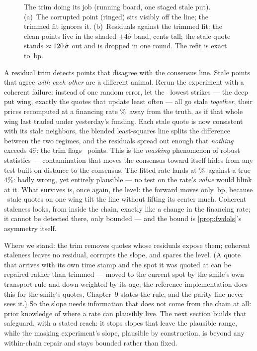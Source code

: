 \begin{figure}[htbp]
\centering
{}
\caption{The trim doing its job (running board, one staged stale
put).  (a)~The corrupted point (ringed) sits visibly off the line;
the trimmed fit ignores it.  (b)~Residuals against the trimmed fit:
the clean points live in the shaded $\pm4\hat\sigma$ band, cents
tall; the stale quote stands $\approx120\,\hat\sigma$
out and is dropped in one round.  The refit is exact to
\MacFwdTrimErrBp\,bp.}
\label{fig:fwdtrim}
\end{figure}

\begin{remark}
\label{rem:fwdmask}
A residual trim detects points that disagree with the consensus line.
Stale points that agree \emph{with each other} are a different
animal.  Rerun the experiment with a coherent failure: instead of one
random error, let the \MacFwdMaskNWing\ lowest strikes --- the deep
put wing, exactly the quotes that update least often --- all go stale
\emph{together}, their prices recomputed at a financing rate
\MacFwdMaskDeltaRatePct\%\ away from the truth, as if that whole wing
last traded under yesterday's funding.  Each stale quote is now consistent with its stale
neighbors, the blended least-squares line splits the difference
between the two regimes, and the residuals spread out enough that
\emph{nothing} exceeds $4\hat\sigma$: the trim flags
\MacFwdMaskNOut\ points.  This is the \emph{masking} phenomenon of
robust statistics \citep{RousseeuwLeroy1987} --- contamination that
moves the consensus toward itself hides from any test built on
distance to the consensus.  The fitted rate lands at
\MacFwdMaskRatePct\%\ against a true $4\%$: badly wrong, yet entirely
plausible --- no test on the rate's \emph{value} would blink at it.  What survives is, once again, the level:
the forward moves only \MacFwdMaskFwdErrBp\,bp, because
\MacFwdMaskNWing\ stale quotes on one wing tilt the line without
lifting its center much.  Coherent staleness looks, from inside the
chain, exactly like a change in the financing rate; it cannot be
detected there, only bounded --- and the bound is
\cref{prop:fwdols}'s asymmetry itself.
\end{remark}

Where we stand: the trim removes quotes whose residuals expose them;
coherent staleness leaves no residual, corrupts the slope, and
spares the level.  (A quote that arrives with its own time stamp and
the spot it was quoted at can be repaired rather than trimmed --- moved
to the current spot by the smile's own transport rule and
down-weighted by its age; the reference implementation does this for
the smile's quotes, Chapter~9 states the rule, and the parity line
never sees it.)  So the slope needs information that does not come
from the chain at all: prior knowledge of where a rate can plausibly
live.  The next section builds that safeguard, with a stated reach:
it stops slopes that leave the plausible range, while the
masking experiment's slope, plausible by construction, is beyond any
within-chain repair and stays bounded rather than fixed.
